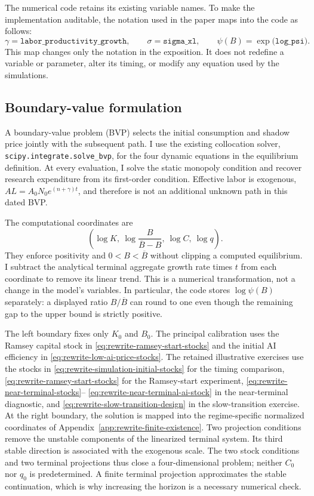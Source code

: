 The numerical code retains its existing variable names. To make the
implementation auditable, the notation used in the paper maps into the code as
follows:
\begin{equation}
 \gamma=\texttt{labor\_productivity\_growth},\qquad
 \sigma=\texttt{sigma\_xl},\qquad
 \psi(B)=\exp\!\bigl(\texttt{log\_psi}\bigr).
 \label{eq:rewrite-code-notation-map}
\end{equation}
This map changes only the notation in the exposition. It does not redefine a
variable or parameter, alter its timing, or modify any equation used by the
simulations.

\subsection{Boundary-value formulation}

A boundary-value problem (BVP) selects the initial consumption and shadow
price jointly with the subsequent path. I use the existing collocation
solver, \texttt{scipy.integrate.solve\_bvp}, for the four dynamic equations
in the equilibrium definition. At every evaluation, I solve the static
monopoly condition and recover research expenditure from its first-order
condition. Effective labor is exogenous, $AL=A_0N_0e^{(n+\gamma)t}$, and
therefore is not an additional unknown path in this dated BVP.

The computational coordinates are
\[
 \left(\log K,\ \log\frac{B}{\overline B-B},\ \log C,\ \log q\right).
\]
They enforce positivity and $0<B<\overline B$ without clipping a computed
equilibrium. I subtract the analytical terminal aggregate growth rate
times $t$ from each coordinate to remove its linear trend. This is a
numerical transformation, not a change in the model's variables. In
particular, the code stores $\log\psi(B)$ separately: a displayed ratio
$B/\overline B$ can round to one even though the remaining gap to the upper bound
is strictly positive.

The left boundary fixes only $K_0$ and $B_0$. The principal calibration uses
the Ramsey capital stock in \eqref{eq:rewrite-ramsey-start-stocks} and the
initial AI efficiency in \eqref{eq:rewrite-low-ai-price-stocks}. The retained
illustrative exercises use the stocks in
\eqref{eq:rewrite-simulation-initial-stocks} for the timing comparison,
\eqref{eq:rewrite-ramsey-start-stocks} for the Ramsey-start experiment,
\eqref{eq:rewrite-near-terminal-stocks}--
\eqref{eq:rewrite-near-terminal-ai-stock} in the near-terminal diagnostic, and
\eqref{eq:rewrite-slow-transition-design} in the slow-transition exercise. At
the right boundary, the
solution is mapped into the regime-specific normalized coordinates of
Appendix~\ref{app:rewrite-finite-existence}. Two projection conditions remove
the unstable components of the linearized terminal system. Its third stable
direction is associated with the exogenous scale. The two stock conditions
and two terminal projections thus close a four-dimensional problem;
neither $C_0$ nor $q_0$ is predetermined. A finite terminal projection
approximates the stable continuation, which is why increasing the horizon
is a necessary numerical check.

